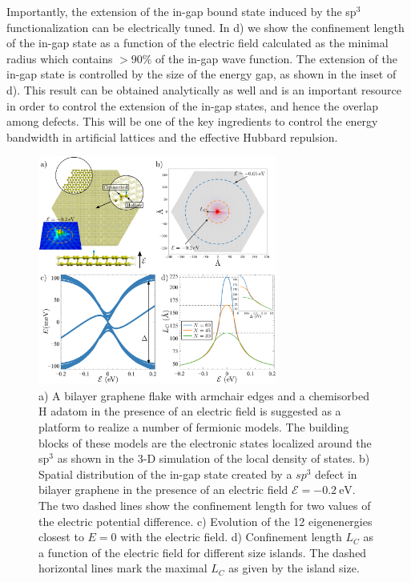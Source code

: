 Importantly, the extension of the in-gap bound state induced by the sp$^3$ functionalization can be electrically tuned. In d) we show the confinement length of the in-gap state as a function of the electric field calculated as the minimal radius which contains $> 90\%$ of the in-gap wave function.
The extension of the in-gap state is controlled by the size of the energy gap, as shown in the inset of d). This result can be obtained analytically as well\cite{Nilsson2007} and is an important resource in order to control the extension of the in-gap states, and hence the overlap among defects. This will be one of the key ingredients to control the energy bandwidth in artificial lattices and the effective Hubbard repulsion.


\begin{figure}[h!]
\centering
\includegraphics[width=0.7\textwidth]{designer/figures/fig1.pdf}
\vspace{-5pt}
\caption{a) A bilayer graphene flake with armchair edges and a chemisorbed H adatom in the presence of an electric field is suggested as a platform to realize a number of fermionic models. The building blocks of these models are the electronic states localized around the sp$^3$ as shown in the 3-D simulation of the local density of states. b) Spatial distribution of the in-gap state created by a $sp^3$ defect in bilayer graphene in the presence of an electric field $\mathcal{E}=\SI{-0.2}{\eV}$. The two dashed lines show the confinement length for two values of the electric potential difference. c) Evolution of the 12 eigenenergies closest to $E=0$ with the electric field. d) Confinement length $L_C$ as a function of the electric field for different size islands. The dashed horizontal lines mark the maximal $L_C$ as given by the island size.}
\label{figure1}
\end{figure}


